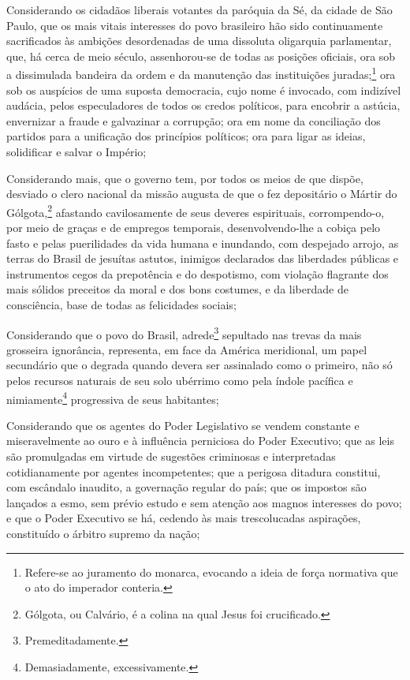 Considerando os cidadãos liberais votantes da paróquia da Sé, da cidade
de São Paulo, que os mais vitais interesses do povo brasileiro hão sido
continuamente sacrificados às ambições desordenadas de uma dissoluta
oligarquia parlamentar, que, há cerca de meio século, assenhorou-se de
todas as posições oficiais, ora sob a dissimulada bandeira da ordem e da
manutenção das instituições juradas;\footnote{Refere-se ao juramento do
  monarca, evocando a ideia de força normativa que o ato do imperador
  conteria.} ora sob os auspícios de uma suposta democracia, cujo nome
é invocado, com indizível audácia, pelos especuladores de todos os
credos políticos, para encobrir a astúcia, envernizar a fraude e
galvazinar a corrupção; ora em nome da conciliação dos partidos para a
unificação dos princípios políticos; ora para ligar as ideias,
solidificar e salvar o Império;

Considerando mais, que o governo tem, por todos os meios de que dispõe,
desviado o clero nacional da missão augusta de que o fez depositário o
Mártir do Gólgota,\footnote{Gólgota, ou Calvário, é a colina na qual
  Jesus foi crucificado.} afastando cavilosamente de seus deveres
espirituais, corrompendo-o, por meio de graças e de empregos temporais,
desenvolvendo-lhe a cobiça pelo fasto e pelas puerilidades da vida
humana e inundando, com despejado arrojo, as terras do Brasil de
jesuítas astutos, inimigos declarados das liberdades públicas e
instrumentos cegos da prepotência e do despotismo, com violação
flagrante dos mais sólidos preceitos da moral e dos bons costumes, e da
liberdade de consciência, base de todas as felicidades sociais;

Considerando que o povo do Brasil, adrede\footnote{Premeditadamente.}
sepultado nas trevas da mais grosseira ignorância, representa, em face
da América meridional, um papel secundário que o degrada quando devera
ser assinalado como o primeiro, não só pelos recursos naturais de seu
solo ubérrimo como pela índole pacífica e nimiamente\footnote{
  Demasiadamente, excessivamente.} progressiva de seus habitantes;

Considerando que os agentes do Poder Legislativo se vendem constante e
miseravelmente ao ouro e à influência perniciosa do Poder Executivo; que
as leis são promulgadas em virtude de sugestões criminosas e
interpretadas cotidianamente por agentes incompetentes; que a perigosa
ditadura constitui, com escândalo inaudito, a governação regular do
país; que os impostos são lançados a esmo, sem prévio estudo e sem
atenção aos magnos interesses do povo; e que o Poder Executivo se há,
cedendo às mais trescolucadas aspirações, constituído o árbitro supremo %
da nação;


